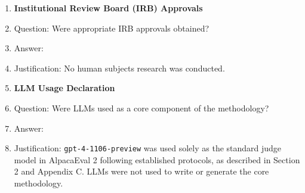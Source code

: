 \begin{enumerate}
\item {\bf Institutional Review Board (IRB) Approvals}
  \item[] Question: Were appropriate IRB approvals obtained?
  \item[] Answer: \answerNA{}
  \item[] Justification: No human subjects research was conducted.

\item {\bf LLM Usage Declaration}
  \item[] Question: Were LLMs used as a core component of the methodology?
  \item[] Answer: \answerYes{}
  \item[] Justification: \texttt{gpt-4-1106-preview} was used solely as the standard judge model in AlpacaEval 2 following established protocols, as described in Section 2 and Appendix C. LLMs were not used to write or generate the core methodology.

\end{enumerate}
